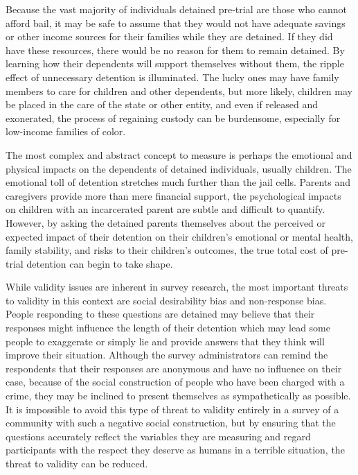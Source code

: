 \documentclass[
  letterpaper,
  DIV=11,
  numbers=noendperiod]{scrartcl}
\begin{document}
Because the vast majority of individuals detained pre-trial are those
who cannot afford bail, it may be safe to assume that they would not
have adequate savings or other income sources for their families while
they are detained. If they did have these resources, there would be no
reason for them to remain detained. By learning how their dependents
will support themselves without them, the ripple effect of unnecessary
detention is illuminated. The lucky ones may have family members to care
for children and other dependents, but more likely, children may be
placed in the care of the state or other entity, and even if released
and exonerated, the process of regaining custody can be burdensome,
especially for low-income families of color.

The most complex and abstract concept to measure is perhaps the
emotional and physical impacts on the dependents of detained
individuals, usually children. The emotional toll of detention stretches
much further than the jail cells. Parents and caregivers provide more
than mere financial support, the psychological impacts on children with
an incarcerated parent are subtle and difficult to quantify. However, by
asking the detained parents themselves about the perceived or expected
impact of their detention on their children's emotional or mental
health, family stability, and risks to their children's outcomes, the
true total cost of pre-trial detention can begin to take shape.

While validity issues are inherent in survey research, the most
important threats to validity in this context are social desirability
bias and non-response bias. People responding to these questions are
detained may believe that their responses might influence the length of
their detention which may lead some people to exaggerate or simply lie
and provide answers that they think will improve their situation.
Although the survey administrators can remind the respondents that their
responses are anonymous and have no influence on their case, because of
the social construction of people who have been charged with a crime,
they may be inclined to present themselves as sympathetically as
possible. It is impossible to avoid this type of threat to validity
entirely in a survey of a community with such a negative social
construction, but by ensuring that the questions accurately reflect the
variables they are measuring and regard participants with the respect
they deserve as humans in a terrible situation, the threat to validity
can be reduced.
\end{document}
